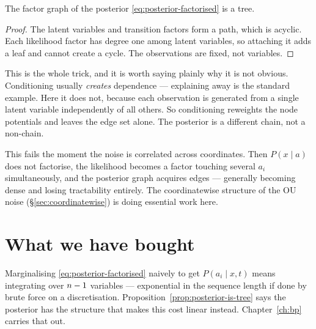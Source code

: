 \begin{proposition}
\label{prop:posterior-is-tree}
The factor graph of the posterior \eqref{eq:posterior-factorised} is a tree.
\end{proposition}

\begin{proof}
The latent variables and transition factors form a path, which is acyclic. Each likelihood
factor has degree one among latent variables, so attaching it adds a leaf and cannot create a
cycle. The observations are fixed, not variables.
\end{proof}

\begin{intuition}
This is the whole trick, and it is worth saying plainly why it is not obvious. Conditioning
usually \emph{creates} dependence --- explaining away is the standard example. Here it does
not, because each observation is generated from a single latent variable independently of all
others. So conditioning reweights the node potentials and leaves the edge set alone. The
posterior is a different chain, not a non-chain.
\end{intuition}

\begin{pitfall}
This fails the moment the noise is correlated across coordinates. Then
$P(x\mid a)$ does not factorise, the likelihood becomes a factor touching several $a_i$
simultaneously, and the posterior graph acquires edges --- generally becoming dense and
losing tractability entirely. The coordinatewise structure of the OU noise
(\S\ref{sec:coordinatewise}) is doing essential work here.
\end{pitfall}

\section{What we have bought}

Marginalising \eqref{eq:posterior-factorised} naively to get $P(a_i\mid x,t)$ means
integrating over $n-1$ variables --- exponential in the sequence length if done by brute
force on a discretisation. Proposition~\ref{prop:posterior-is-tree} says the posterior has the
structure that makes this cost linear instead. Chapter~\ref{ch:bp} carries that out.
